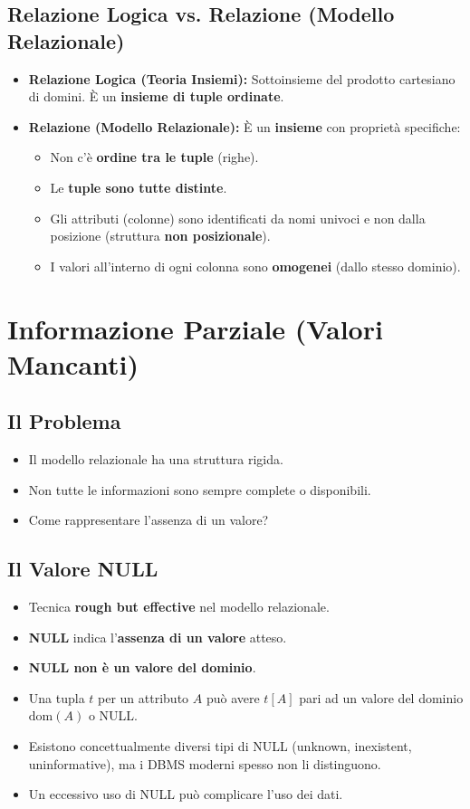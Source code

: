 \documentclass{article}
\begin{document}
	\subsection{Relazione Logica vs. Relazione (Modello Relazionale)}
	\begin{itemize}
		\item \textbf{Relazione Logica (Teoria Insiemi):} Sottoinsieme del prodotto cartesiano di domini. È un \textbf{insieme di tuple ordinate}.
		\item \textbf{Relazione (Modello Relazionale):} È un \textbf{insieme} con proprietà specifiche:
		\begin{itemize}
			\item Non c'è \textbf{ordine tra le tuple} (righe).
			\item Le \textbf{tuple sono tutte distinte}.
			\item Gli attributi (colonne) sono identificati da nomi univoci e non dalla posizione (struttura \textbf{non posizionale}).
			\item I valori all'interno di ogni colonna sono \textbf{omogenei} (dallo stesso dominio).
		\end{itemize}
	\end{itemize}
	
	\section{Informazione Parziale (Valori Mancanti)}
	
	\subsection{Il Problema}
	\begin{itemize}
		\item Il modello relazionale ha una struttura rigida.
		\item Non tutte le informazioni sono sempre complete o disponibili.
		\item Come rappresentare l'assenza di un valore?
	\end{itemize}
	
	\subsection{Il Valore NULL}
	\begin{itemize}
		\item Tecnica \textbf{rough but effective} nel modello relazionale.
		\item \textbf{NULL} indica l'\textbf{assenza di un valore} atteso.
		\item \textbf{NULL non è un valore del dominio}.
		\item Una tupla $t$ per un attributo $A$ può avere $t[A]$ pari ad un valore del dominio $\text{dom}(A)$ o NULL.
		\item Esistono concettualmente diversi tipi di NULL (unknown, inexistent, uninformative), ma i DBMS moderni spesso non li distinguono.
		\item Un eccessivo uso di NULL può complicare l'uso dei dati.
	\end{itemize}
	
\end{document}
